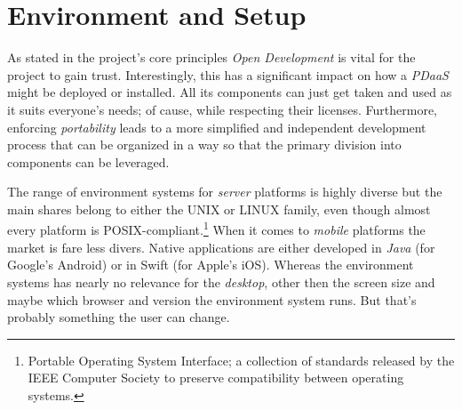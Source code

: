 \documentclass[12pt,english,a4paper,titlepage,cleardoublepage=empty,dottedtoc]{report}
\begin{document}
\section{Environment and Setup}\label{environment-and-setup}

As stated in the project's core principles \emph{Open Development} is
vital for the project to gain trust. Interestingly, this has a
significant impact on how a \emph{PDaaS} might be deployed or installed.
All its components can just get taken and used as it suits everyone's
needs; of cause, while respecting their licenses. Furthermore, enforcing
\emph{portability} leads to a more simplified and independent
development process that can be organized in a way so that the primary
division into components can be leveraged.

The range of environment systems for \emph{server} platforms is highly
diverse but the main shares belong to either the UNIX or LINUX family,
even though almost every platform is POSIX-compliant.\footnote{Portable
  Operating System Interface; a collection of standards released by the
  IEEE Computer Society to preserve compatibility between operating
  systems.} When it comes to \emph{mobile} platforms the market is fare
less divers. Native applications are either developed in \emph{Java}
(for Google's Android) or in Swift (for Apple's iOS). Whereas the
environment systems has nearly no relevance for the \emph{desktop},
other then the screen size and maybe which browser and version the
environment system runs. But that's probably something the user can
change.
\end{document}
